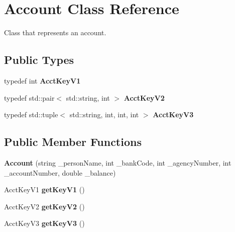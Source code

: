 \hypertarget{classAccount}{}\section{Account Class Reference}
\label{classAccount}


Class that represents an account.  


\subsection*{Public Types}
\begin{DoxyCompactItemize}
\item 
typedef int {\bfseries Acct\+Key\+V1}\hypertarget{classAccount_a0e7e3d956d27079c6257e7397b6d6424}{}\label{classAccount_a0e7e3d956d27079c6257e7397b6d6424}

\item 
typedef std\+::pair$<$ std\+::string, int $>$ {\bfseries Acct\+Key\+V2}\hypertarget{classAccount_ad9973a0b8e84512499cddbf68ac2062a}{}\label{classAccount_ad9973a0b8e84512499cddbf68ac2062a}

\item 
typedef std\+::tuple$<$ std\+::string, int, int, int $>$ {\bfseries Acct\+Key\+V3}\hypertarget{classAccount_a489e12d29ac9dc2144b2496c75d0b68d}{}\label{classAccount_a489e12d29ac9dc2144b2496c75d0b68d}

\end{DoxyCompactItemize}
\subsection*{Public Member Functions}
\begin{DoxyCompactItemize}
\item 
{\bfseries Account} (string \+\_\+person\+Name, int \+\_\+bank\+Code, int \+\_\+agency\+Number, int \+\_\+account\+Number, double \+\_\+balance)\hypertarget{classAccount_aaff96bfbd914c07217fcd855f464e932}{}\label{classAccount_aaff96bfbd914c07217fcd855f464e932}

\item 
Acct\+Key\+V1 {\bfseries get\+Key\+V1} ()\hypertarget{classAccount_a783df021d14663577eaf4c9c0fce1eca}{}\label{classAccount_a783df021d14663577eaf4c9c0fce1eca}

\item 
Acct\+Key\+V2 {\bfseries get\+Key\+V2} ()\hypertarget{classAccount_a6823ec6d477c7007f9dbfe0d24255975}{}\label{classAccount_a6823ec6d477c7007f9dbfe0d24255975}

\item 
Acct\+Key\+V3 {\bfseries get\+Key\+V3} ()\hypertarget{classAccount_a36e71258cb2c1a576b7f1906f44afbdc}{}\label{classAccount_a36e71258cb2c1a576b7f1906f44afbdc}

\end{DoxyCompactItemize}

